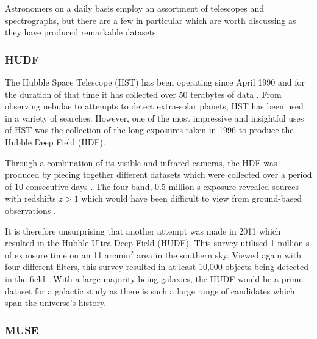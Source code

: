 \documentclass[12pt, twocolumn]{revtex4-1}    %
\begin{document}
Astronomers on a daily basis employ an assortment of telescopes and spectrographs, but there are a few in particular which are worth discussing as they have produced remarkable datasets.

\subsubsection{HUDF}

The Hubble Space Telescope (HST) has been operating since April 1990 and for the duration of that time it has collected over 50 terabytes of data \citep{mccoy_space_sciences}. From observing nebulae to attempts to detect extra-solar planets, HST has been used in a variety of searches. However, one of the most impressive and insightful uses of HST was the collection of the long-exposures taken in 1996 to produce the Hubble Deep Field (HDF). 

Through a combination of its visible and infrared cameras, the HDF was produced by piecing together different datasets which were collected over a period of 10 consecutive days \citep{mccoy_space_sciences, williams_hdp}. The four-band, 0.5 million s exposure revealed sources with redshifts $z>1$ which would have been difficult to view from ground-based observations \citep{beckwith_hudf}. 


It is therefore unsurprising that another attempt was made in 2011 which resulted in the Hubble Ultra Deep Field (HUDF). This survey utilised 1 million s of exposure time on an 11 arcmin$^2$ area in the southern sky. Viewed again with four different filters, this survey resulted in at least 10,000 objects being detected in the field \citep{beckwith_hudf}. With a large majority being galaxies, the HUDF would be a prime dataset for a galactic study as there is such a large range of candidates which span the universe's history. 



\subsubsection{MUSE}
\end{document}
